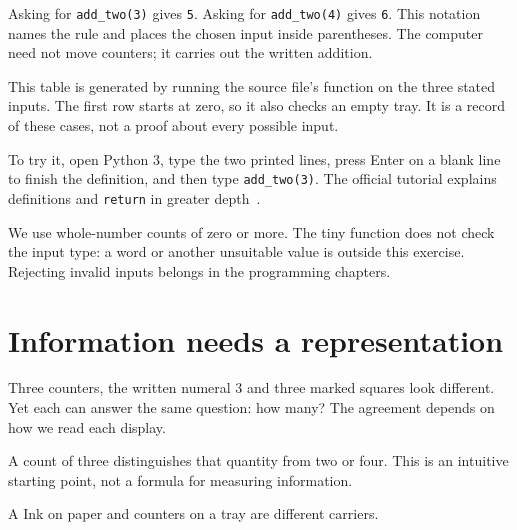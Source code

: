 Asking for \texttt{add\_two(3)} gives \texttt{5}. Asking for \texttt{add\_two(4)} gives \texttt{6}. This notation names the rule and places the chosen input inside parentheses. The computer need not move counters; it carries out the written addition.

This table is generated by running the source file's function on the three stated inputs. The first row starts at zero, so it also checks an empty tray. It is a record of these cases, not a proof about every possible input.

To try it, open Python 3, type the two printed lines, press Enter on a blank line to finish the definition, and then type \texttt{add\_two(3)}. The official tutorial explains definitions and \texttt{return} in greater depth~\cite{python}.

We use whole-number counts of zero or more. The tiny function does not check the input type: a word or another unsuitable value is outside this exercise. Rejecting invalid inputs belongs in the programming chapters.

\clearpage
\section{Information needs a representation}\label{sec:representation}
Three counters, the written numeral 3 and three marked squares look different. Yet each can answer the same question: how many? The agreement depends on how we read each display.

 A count of three distinguishes that quantity from two or four. This is an intuitive starting point, not a formula for measuring information.

 A  Ink on paper and counters on a tray are different carriers.

